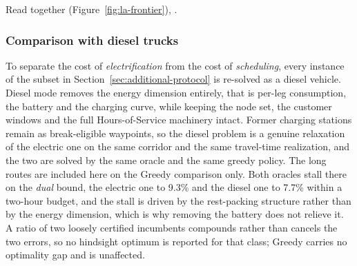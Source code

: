   Read together (Figure~\ref{fig:la-frontier}),
.

%
%
%
%


\subsubsection{Comparison with diesel trucks}
\label{sec:diesel}

To separate the cost of \emph{electrification} from the cost of
\emph{scheduling}, every instance of the subset in
Section~\ref{sec:additional-protocol} is re-solved as a diesel vehicle.  Diesel
mode removes the energy dimension entirely, that is per-leg consumption, the
battery and the charging curve, while keeping the node set, the customer windows
and the full Hours-of-Service machinery intact.  Former charging stations remain
as break-eligible waypoints, so the diesel problem is a genuine relaxation of
the electric one on the same corridor and the same travel-time realization, and
the two are solved by the same oracle and the same greedy policy.  The long
routes are included here on the Greedy comparison only.  Both oracles stall
there on the \emph{dual} bound, the electric one to 9.3\% and the diesel one
to 7.7\% within a two-hour budget, and the stall is driven by the rest-packing
structure rather than by the energy dimension, which is why removing the
battery does not relieve it.  A ratio of two loosely certified incumbents
compounds rather than cancels the two errors, so no hindsight optimum is
reported for that class; Greedy carries no optimality gap and is unaffected.

